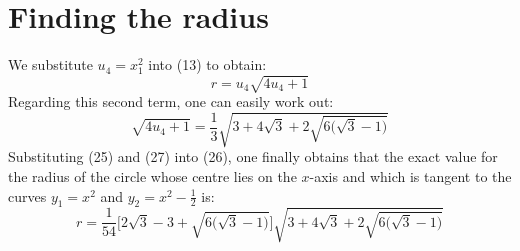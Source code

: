 \documentclass{article}
\begin{document}
\section{Finding the radius}
We substitute $u_4=x_1^2$ into (13) to obtain:
\begin{equation}
    \tag{26} r= u_4\sqrt{4u_4+1}
\end{equation}
Regarding this second term, one can easily work out:
\begin{equation*}
    \tag{27} \sqrt{4u_4+1}=\frac{1}{3}\sqrt{3+4\sqrt{3}+2\sqrt{6\big(\sqrt{3}-1\big)}}
\end{equation*}
Substituting (25) and (27) into (26), one finally obtains that the exact value for the radius of the circle whose centre lies on the $x$-axis and which is tangent to the curves $y_1=x^2$ and $y_2=x^2-\frac{1}{2}$ is:
\begin{equation*}
    \tag{28} r=\frac{1}{54}\bigg[2\sqrt3-3+\sqrt{6\big(\sqrt{3}-1\big)}\bigg]\sqrt{3+4\sqrt{3}+2\sqrt{6\big(\sqrt{3}-1\big)}}
\end{equation*}
\end{document}
